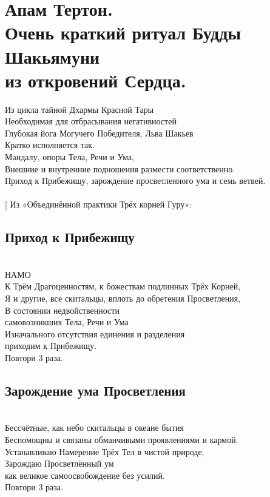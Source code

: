 \section{Апам Тертон.\\Очень краткий ритуал Будды Шакьямуни\\из откровений Сердца.}
\scriptsize
Из цикла тайной Дхармы Красной Тары\\
Необходимая для отбрасывания негативностей \\
Глубокая йога Могучего Победителя, Льва Шакьев\\
Кратко исполняется так.\\
Мандалу, опоры Тела, Речи и Ума,\\
Внешние и внутренние подношения размести соответственно.\\
Приход к Прибежищу, зарождение просветленного ума и семь ветвей.\\
\\
\vspace{1cm}
\normalsize
[ \scriptsize Из «Объединённой практики Трёх корней Гуру»: \normalsize
\subsection*{Приход к Прибежищу}
\\

НАМО\\
К Трём Драгоценностям, к божествам подлинных Трёх Корней,\\
Я и другие, все скитальцы, вплоть до обретения Просветления,\\
В состоянии недвойственности \\ \indent самовозникших Тела, Речи и Ума\\
Изначального отсутствия единения и разделения \\ \indent приходим к Прибежищу.\\
\scriptsize
\indent Повтори 3 раза.
\normalsize

\subsection*{Зарождение ума Просветления}
\\
Бессчётные, как небо скитальцы в океане бытия\\
Беспомощны и связаны обманчивыми проявлениями и кармой.\\
Устанавливаю Намерение Трёх Тел в чистой природе, \\
Зарождаю Просветлённый ум \\ \indent как великое самоосвобождение без усилий. \\
\scriptsize
\indent Повтори 3 раза.\\
\normalsize

